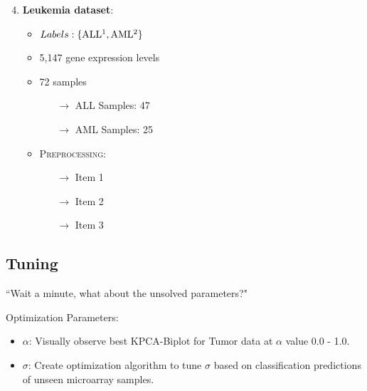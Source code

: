 \documentclass[serif]{beamer}
\begin{document}
\begin{frame}[t]
{\begin{enumerate}
\begin{itemize}
				\end{itemize}
		\end{enumerate}
		}
		{
		\begin{enumerate}
			\setcounter{enumi}{3}
			\item {\bf Leukemia dataset}:
					\begin{itemize}
					\item  $ Labels: 	\left
						 \{ \text{ALL}\footnote{Acute lymphoblastic leukemia},
						 \text{AML}\footnote{Acute myeloid leukemia}
								 \right \}$
					\item 5,147 gene expression levels
					\item 72 samples
					\begin{itemize}
						\item[$\rightarrow$] \textsc{ALL} Samples: 47
						\item[$\rightarrow$] \textsc{AML} Samples: 25
					\end{itemize}
					\item  \textsc{Preprocessing:}
					\begin{itemize}
						\item[$\rightarrow$] Item 1
						\item[$\rightarrow$] Item 2
						\item[$\rightarrow$] Item 3
					\end{itemize}
				\end{itemize}
		\end{enumerate}		
		}
	\end{frame}

	\subsection{Tuning}
	\begin{frame}
		\begin{center}
			\huge
			``Wait a minute, what about the unsolved parameters?"
		\end{center}
	\end{frame}
	
	\begin{frame}
		\begin{block}{Optimization Parameters:}
			\begin{itemize}
				\item  $\alpha$: Visually observe best KPCA-Biplot for Tumor data at $\alpha$ value 0.0 - 1.0.
				\item  $\sigma$: Create optimization algorithm to tune $\sigma$
				based on classification predictions of unseen microarray samples.
			\end{itemize}
		\end{block}	
	\end{frame}
	
\end{document}
